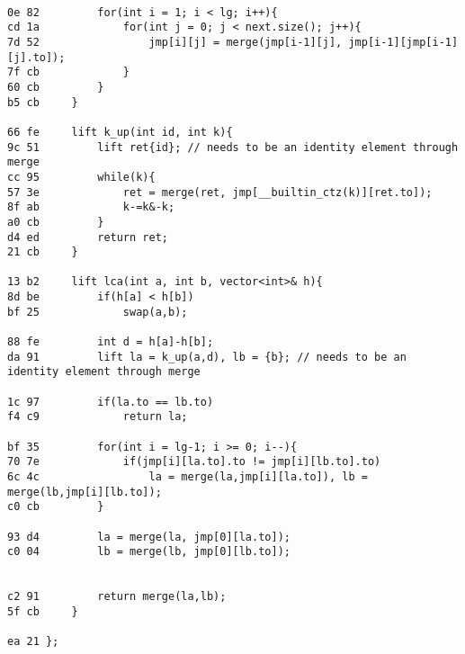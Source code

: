 \documentclass[11pt, a4paper, twoside]{article}
\begin{document}
\begin{lstlisting}
      
0e 82         for(int i = 1; i < lg; i++){
cd 1a             for(int j = 0; j < next.size(); j++){
7d 52                 jmp[i][j] = merge(jmp[i-1][j], jmp[i-1][jmp[i-1][j].to]);
7f cb             }
60 cb         }
b5 cb     }
      
66 fe     lift k_up(int id, int k){
9c 51         lift ret{id}; // needs to be an identity element through merge
cc 95         while(k){
57 3e             ret = merge(ret, jmp[__builtin_ctz(k)][ret.to]);
8f ab             k-=k&-k;
a0 cb         }
d4 ed         return ret;
21 cb     }
      
13 b2     lift lca(int a, int b, vector<int>& h){
8d be         if(h[a] < h[b])
bf 25             swap(a,b);
              
88 fe         int d = h[a]-h[b];
da 91         lift la = k_up(a,d), lb = {b}; // needs to be an identity element through merge
      
1c 97         if(la.to == lb.to)
f4 c9             return la;
              
bf 35         for(int i = lg-1; i >= 0; i--){
70 7e             if(jmp[i][la.to].to != jmp[i][lb.to].to)
6c 4c                 la = merge(la,jmp[i][la.to]), lb = merge(lb,jmp[i][lb.to]);
c0 cb         }
      
93 d4         la = merge(la, jmp[0][la.to]);
c0 04         lb = merge(lb, jmp[0][lb.to]);
      
      
c2 91         return merge(la,lb);
5f cb     }
      
ea 21 };
\end{lstlisting}
\end{document}
